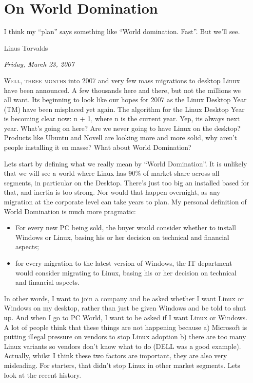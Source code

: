 \documentclass{book}
\begin{document}
\chapter{On World Domination}

\epigraph{I think my ``plan'' says something like ``World
  domination. Fast''. But we'll see.}{Linus Torvalds}

\begin{flushright}
  \emph{Friday, March 23, 2007 }
\end{flushright}

\lettrine{W}{ell, three months} into 2007 and very few mass migrations
to desktop Linux have been announced. A few thousands here and there,
but not the millions we all want. Its beginning to look like our hopes
for 2007 as the Linux Desktop Year (TM) have been misplaced yet
again. The algorithm for the Linux Desktop Year is becoming clear now:
n + 1, where n is the current year. Yep, its always next year. What's
going on here? Are we never going to have Linux on the desktop?
Products like Ubuntu and Novell are looking more and more solid, why
aren't people installing it en masse? What about World Domination?

Lets start by defining what we really mean by ``World Domination''. It
is unlikely that we will see a world where Linux has 90\% of market
share across all segments, in particular on the Desktop. There's just
too big an installed based for that, and inertia is too strong. Nor
would that happen overnight, as any migration at the corporate level
can take years to plan. My personal definition of World Domination is
much more pragmatic:

\begin{itemize}
\item For every new PC being sold, the buyer would consider whether to
  install Windows or Linux, basing his or her decision on technical
  and financial aspects;
\item for every migration to the latest version of Windows, the IT
  department would consider migrating to Linux, basing his or her
  decision on technical and financial aspects.
\end{itemize}

In other words, I want to join a company and be asked whether I want
Linux or Windows on my desktop, rather than just be given Windows and
be told to shut up. And when I go to PC World, I want to be asked if I
want Linux or Windows. A lot of people think that these things are not
happening because a) Microsoft is putting illegal pressure on vendors
to stop Linux adoption b) there are too many Linux variants so vendors
don't know what to do (DELL was a good example). Actually, whilst I
think these two factors are important, they are also very
misleading. For starters, that didn't stop Linux in other market
segments. Lets look at the recent history.
\end{document}
